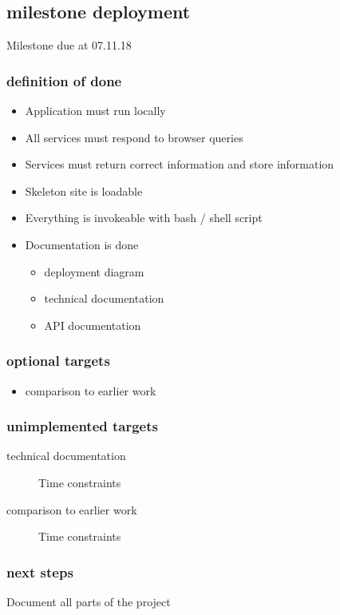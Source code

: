 \documentclass{article}
\begin{document}
        
    
\subsection{milestone deployment}

Milestone due at 07.11.18

\subsubsection{definition of done}
\begin{itemize}
    \item Application must run locally \checkmark
    \item All services must respond to browser queries \checkmark
    \item Services must return correct information and store information \checkmark
    \item Skeleton site is loadable \checkmark
    \item Everything is invokeable with bash / shell script \checkmark
    \item Documentation is done
    \begin{itemize}
        \item deployment diagram \checkmark
        \item technical documentation
        \item API documentation \checkmark
    \end{itemize}
\end{itemize}

\subsubsection{optional targets}
\begin{itemize}
    \item comparison to earlier work
\end{itemize}

\subsubsection{unimplemented targets}
\begin{description}
    \item[technical documentation] Time constraints
    \item[comparison to earlier work] Time constraints
\end{description}

\subsubsection{next steps}
Document all parts of the project
\end{document}
